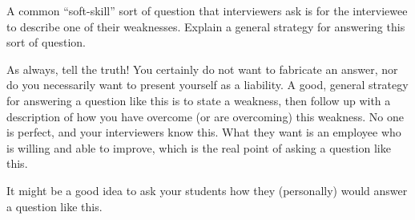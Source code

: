 

A common ``soft-skill'' sort of question that interviewers ask is for the interviewee to describe one of their weaknesses.  Explain a general strategy for answering this sort of question.

\vskip 50pt







As always, tell the truth!  You certainly do not want to fabricate an answer, nor do you necessarily want to present yourself as a liability.  A good, general strategy for answering a question like this is to state a weakness, then follow up with a description of how you have overcome (or are overcoming) this weakness.  No one is perfect, and your interviewers know this.  What they want is an employee who is willing and able to improve, which is the real point of asking a question like this.







It might be a good idea to ask your students how they (personally) would answer a question like this.




